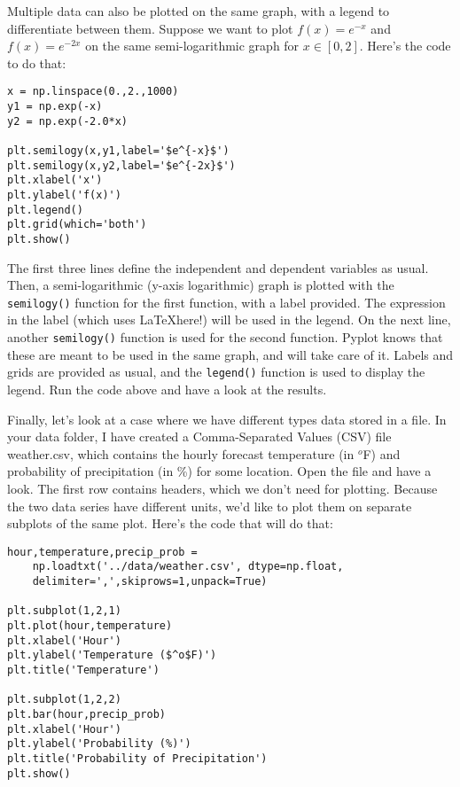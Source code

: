 \documentclass[12pt]{article}
\newcommand{\code}{\texttt}
\begin{document}
Multiple data can also be plotted on the same graph, with a legend to differentiate between them. Suppose we want to plot $f(x)=e^{-x}$ and $f(x)=e^{-2x}$ on the same semi-logarithmic graph for $x \in [0,2]$. Here's the code to do that:

\begin{lstlisting}[frame=single] 
x = np.linspace(0.,2.,1000)
y1 = np.exp(-x)
y2 = np.exp(-2.0*x)

plt.semilogy(x,y1,label='$e^{-x}$')
plt.semilogy(x,y2,label='$e^{-2x}$')
plt.xlabel('x')
plt.ylabel('f(x)')
plt.legend()
plt.grid(which='both')
plt.show()
\end{lstlisting}

The first three lines define the independent and dependent variables as usual. Then, a semi-logarithmic (y-axis logarithmic) graph is plotted with the \code{semilogy()} function for the first function, with a label provided. The expression in the label (which uses \LaTeX here!) will be used in the legend. On the next line, another \code{semilogy()} function is used for the second function. Pyplot knows that these are meant to be used in the same graph, and will take care of it. Labels and grids are provided as usual, and the \code{legend()} function is used to display the legend. Run the code above and have a look at the results.

Finally, let's look at a case where we have different types data stored in a file. In your data folder, I have created a Comma-Separated Values (CSV) file weather.csv, which contains the hourly forecast temperature (in $^o$F) and probability of precipitation (in \%) for some location. Open the file and have a look. The first row contains headers, which we don't need for plotting. Because the two data series have different units, we'd like to plot them on separate subplots of the same plot. Here's the code that will do that:

\begin{lstlisting}[frame=single] 
hour,temperature,precip_prob = 
	np.loadtxt('../data/weather.csv', dtype=np.float,
	delimiter=',',skiprows=1,unpack=True)

plt.subplot(1,2,1)
plt.plot(hour,temperature)
plt.xlabel('Hour')
plt.ylabel('Temperature ($^o$F)')
plt.title('Temperature')

plt.subplot(1,2,2)
plt.bar(hour,precip_prob)
plt.xlabel('Hour')
plt.ylabel('Probability (%)')
plt.title('Probability of Precipitation')
plt.show()
\end{lstlisting}
\end{document}
